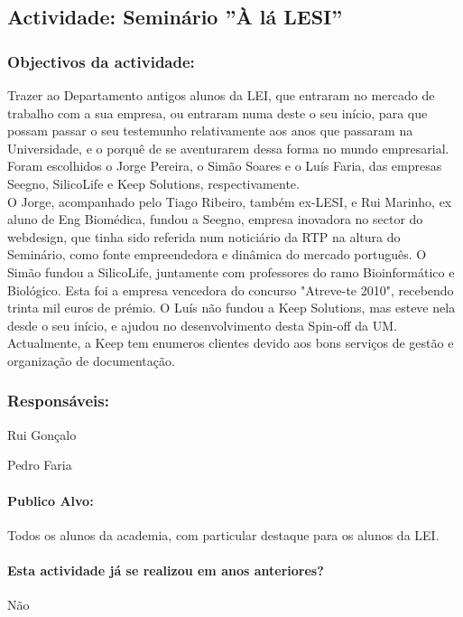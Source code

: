 \subsection{Actividade: Seminário ''À lá LESI''} %

\subsubsection*{Objectivos da actividade:}
Trazer ao Departamento antigos alunos da LEI, que entraram no mercado de trabalho com a sua empresa, ou entraram numa deste o seu início, para que possam passar o seu testemunho relativamente aos anos que passaram na Universidade, e o porquê de se aventurarem dessa forma no mundo empresarial. Foram escolhidos o Jorge Pereira, o Simão Soares e o Luís Faria, das empresas Seegno, SilicoLife e Keep Solutions, respectivamente.\\
O Jorge, acompanhado pelo Tiago Ribeiro, também ex-LESI, e Rui Marinho, ex aluno de Eng Biomédica, fundou a Seegno, empresa inovadora no sector do webdesign, que tinha sido referida num noticiário da RTP na altura do Seminário, como fonte empreendedora e dinâmica do mercado português. O Simão fundou a SilicoLife, juntamente com professores do ramo Bioinformático e Biológico. Esta foi a empresa vencedora do concurso "Atreve-te 2010", recebendo trinta mil euros de prémio. O Luís não fundou a Keep Solutions, mas esteve nela desde o seu início, e ajudou no desenvolvimento desta Spin-off da UM. Actualmente, a Keep tem enumeros clientes devido aos bons serviços de gestão e organização de documentação.

\subsubsection*{Responsáveis:}
\begin{itemizedash}
	\item{Rui Gonçalo}
	\item{Pedro Faria}
\end{itemizedash}

\paragraph{Publico Alvo: }
Todos os alunos da academia, com particular destaque para os alunos da LEI.

\paragraph{Esta actividade já se realizou em anos anteriores?}
Não

